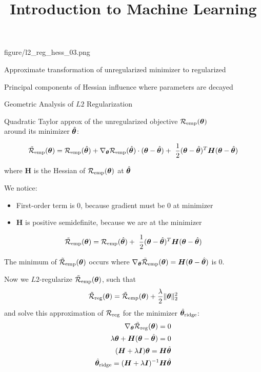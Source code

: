 \documentclass[11pt,compress,t,notes=noshow, xcolor=table]{beamer}
\title{Introduction to Machine Learning}
\begin{document}
{figure/l2_reg_hess_03.png} {
  \item Approximate transformation of unregularized minimizer to regularized 
  \item Principal components of Hessian influence where parameters are decayed  
}

\begin{vbframe}{Geometric Analysis of $L2$ Regularization}

Quadratic Taylor approx of the unregularized objective $\mathcal{R}_{\text{emp}}(\bm{\theta})$ \\
around its minimizer $\hat{\bm{\theta}}$:

$$ \mathcal{\tilde R}_{\text{emp}}(\bm{\theta})= \mathcal{R}_{\text{emp}}(\hat{\bm{\theta}}) + \nabla_{\bm{\theta}} \mathcal{R}_{\text{emp}}(\hat{\bm{\theta}})\cdot(\bm{\theta} - \hat{\bm{\theta}}) + \ \frac{1}{2} (\bm{\theta} - \hat{\bm{\theta}})^T \bm{H} (\bm{\theta} - \hat{\bm{\theta}}) $$

where $\bm{H}$ is the Hessian of $\mathcal{R}_{\text{emp}}(\bm{\theta})$ at $\hat{\bm{\theta}}$

\lz \lz 

We notice:

\begin{itemize}
  \item First-order term is 0, because gradient must be $0$ at minimizer
  \item $\bm{H}$ is positive semidefinite, because we are at the minimizer
\end{itemize}


$$ \mathcal{\tilde R}_{\text{emp}}(\bm{\theta})= \mathcal{R}_{\text{emp}}(\hat{\bm{\theta}}) + \ \frac{1}{2} (\bm{\theta} - \hat{\bm{\theta}})^T \bm{H} (\bm{\theta} - \hat{\bm{\theta}}) $$


\lz

\framebreak

\normalsize

The minimum of $\mathcal{\tilde R}_{\text{emp}}(\bm{\theta})$ occurs where $\nabla_{\bm{\theta}}\mathcal{\tilde R}_{\text{emp}}(\bm{\theta}) = \bm{H}(\bm{\theta} - \hat{\bm{\theta}})$ is $0$.

Now we $L2$-regularize $\mathcal{\tilde R}_{\text{emp}}(\bm{\theta})$, such that 
\[
\mathcal{\tilde R}_{\text{reg}}(\bm{\theta}) = \mathcal{\tilde R}_{\text{emp}}(\bm{\theta}) + \frac{\lambda}{2} \|\bm{\theta}\|^2_2\]
and solve this approximation of $\mathcal{R}_{\text{reg}}$ for the minimizer $\hat{\bm{\theta}}_{\text{ridge}}$:
\begin{align*}
 \nabla_{\bm{\theta}}\mathcal{\tilde R}_{\text{reg}}(\bm{\theta}) = 0\\
  \lambda \bm{\theta} + \bm{H}(\bm{\theta} - \hat{\bm{\theta}}) = 0\\
      (\bm{H} + \lambda \boldsymbol{I}) \bm{\theta} = \bm{H} \hat{\bm{\theta}}\\
      \hat{\bm{\theta}}_{\text{ridge}} = (\bm{H} + \lambda \boldsymbol{I})^{-1}\bm{H} \hat{\bm{\theta}}
\end{align*}


\end{vbframe}
\end{document}
